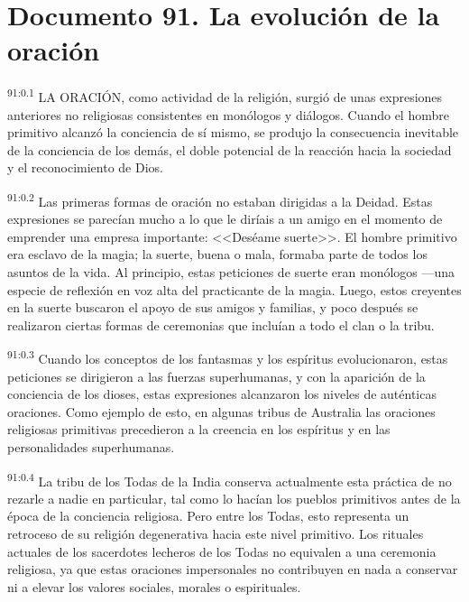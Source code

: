 \chapter{Documento 91. La evolución de la oración}
\par
\textsuperscript{91:0.1} LA ORACIÓN, como actividad de la religión, surgió de unas expresiones anteriores no religiosas consistentes en monólogos y diálogos. Cuando el hombre primitivo alcanzó la conciencia de sí mismo, se produjo la consecuencia inevitable de la conciencia de los demás, el doble potencial de la reacción hacia la sociedad y el reconocimiento de Dios.

\par
\textsuperscript{91:0.2} Las primeras formas de oración no estaban dirigidas a la Deidad. Estas expresiones se parecían mucho a lo que le diríais a un amigo en el momento de emprender una empresa importante: <<Deséame suerte>>. El hombre primitivo era esclavo de la magia; la suerte, buena o mala, formaba parte de todos los asuntos de la vida. Al principio, estas peticiones de suerte eran monólogos ---una especie de reflexión en voz alta del practicante de la magia. Luego, estos creyentes en la suerte buscaron el apoyo de sus amigos y familias, y poco después se realizaron ciertas formas de ceremonias que incluían a todo el clan o la tribu.

\par
\textsuperscript{91:0.3} Cuando los conceptos de los fantasmas y los espíritus evolucionaron, estas peticiones se dirigieron a las fuerzas superhumanas, y con la aparición de la conciencia de los dioses, estas expresiones alcanzaron los niveles de auténticas oraciones. Como ejemplo de esto, en algunas tribus de Australia las oraciones religiosas primitivas precedieron a la creencia en los espíritus y en las personalidades superhumanas.

\par
\textsuperscript{91:0.4} La tribu de los Todas de la India conserva actualmente esta práctica de no rezarle a nadie en particular, tal como lo hacían los pueblos primitivos antes de la época de la conciencia religiosa. Pero entre los Todas, esto representa un retroceso de su religión degenerativa hacia este nivel primitivo. Los rituales actuales de los sacerdotes lecheros de los Todas no equivalen a una ceremonia religiosa, ya que estas oraciones impersonales no contribuyen en nada a conservar ni a elevar los valores sociales, morales o espirituales.

